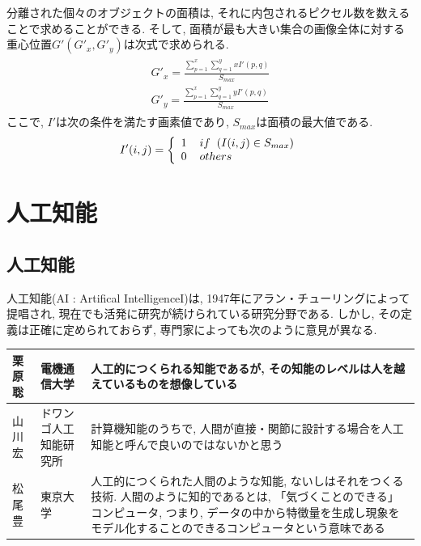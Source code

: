 \documentclass{suribt}
\begin{document}
分離された個々のオブジェクトの面積は, それに内包されるピクセル数を数えることで求めることができる. そして, 面積が最も大きい集合の画像全体に対する重心位置$G'(G'_x, G'_y)$は次式で求められる.
\begin{align}
	\begin{aligned}
		\label{COG_of_Image'}
	G'_x = \frac{\sum_{p=1}^x \sum_{q=1}^y xI'(p, q)}{S_{max}}\\
	G'_y = \frac{\sum_{p=1}^x \sum_{q=1}^y yI'(p, q)}{S_{max}}
	\end{aligned}
\end{align}
ここで, $I'$は次の条件を満たす画素値であり, $S_{max}$は面積の最大値である.
\begin{equation}
	I'(i, j) = \left\{
		\begin{array}{l}
			1 \hspace{4mm} if \hspace{2mm} (I(i, j) \in S_{max})\\
			0 \hspace{4mm} others
		\end{array}
		\right.
\end{equation}


\chapter{人工知能}

\section{人工知能}
人工知能(AI : Artifical IntelligenceI)は, 1947年にアラン・チューリングによって提唱され, 現在でも活発に研究が続けられている研究分野である. しかし, その定義は正確に定められておらず, 専門家によっても次のように意見が異なる.
\begin{table}[htb]
	\begin{tabular}{l|l|p{7cm}}
		\hline
		栗原聡 & 電機通信大学 & 人工的につくられる知能であるが, その知能のレベルは人を越えているものを想像している \\ \hline
		山川宏 & ドワンゴ人工知能研究所 & 計算機知能のうちで, 人間が直接・関節に設計する場合を人工知能と呼んで良いのではないかと思う \\ \hline
		松尾豊 & 東京大学 & 人工的につくられた人間のような知能, ないしはそれをつくる技術. 人間のように知的であるとは, 「気づくことのできる」コンピュータ, つまり, データの中から特徴量を生成し現象をモデル化することのできるコンピュータという意味である \\
		\hline
	\end{tabular}
\end{table}
\end{document}
